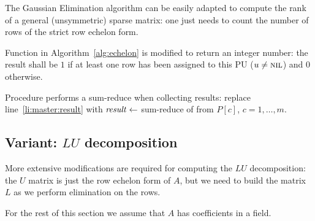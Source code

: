 The Gaussian Elimination algorithm can be easily adapted to compute
the rank of a general (unsymmetric) sparse matrix: one just needs to
count the number of rows of the strict row echelon form.

Function  in Algorithm~\ref{alg:echelon}
is modified to return an integer number: the result shall be $1$ if at
least one row has been assigned to this PU ($u \not= \textnormal{\scshape nil}$) and $0$
otherwise.

Procedure  performs a sum-reduce when collecting results:
replace line~\ref{li:master:result} with $\id{result} \gets$
sum-reduce of  from $P[c]$, $c=1, \ldots, m$.


\subsection{Variant: $LU$ decomposition}
\label{sec:lu}

More extensive modifications are required for computing the $LU$
decomposition: the $U$ matrix is just the row echelon form of $A$, but
we need to build the matrix $L$ as we perform elimination on the rows.

For the rest of this section we assume that $A$ has coefficients in a
field.

